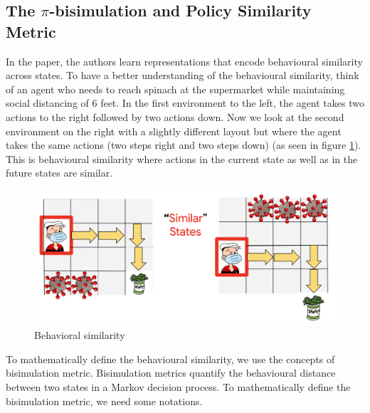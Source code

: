 \documentclass{usiinftr}
\begin{document}
\subsection{The $\pi$-bisimulation and Policy Similarity Metric} \label{sec: PSM}
In the paper, the authors learn representations that encode behavioural similarity across states. To have a better understanding of the behavioural similarity, think of an agent who needs to reach spinach at the supermarket while maintaining social distancing of 6 feet. In the first environment to the left, the agent takes two actions to the right followed by two actions down. Now we look at the second environment on the right with a slightly different layout but where the agent takes the same actions (two steps right and two steps down) (as seen in figure \ref{fig:BehavioralSimilarity}). This is behavioural similarity where actions in the current state as well as in the future states are similar.

\begin{figure}[h]
    \centering
    \includegraphics[width = \linewidth]{figures/image3.png}
    \caption{Behavioral similarity}
    \label{fig:BehavioralSimilarity}
\end{figure}

To mathematically define the behavioural similarity, we use the concepts of bisimulation metric. Bisimulation metrics quantify the behavioural distance between two states in a Markov decision process. To mathematically define the bisimulation metric, we need some notations.
\end{document}
